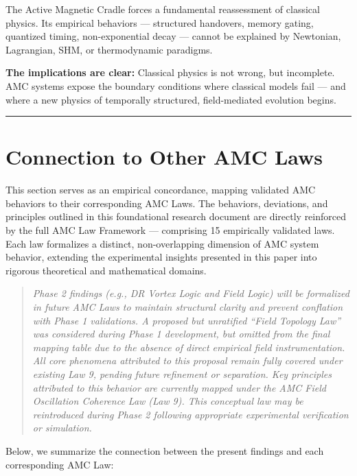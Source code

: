 \documentclass[10pt,aps,pre,onecolumn,superscriptaddress,notitlepage]{revtex4-2}
\begin{document}
The Active Magnetic Cradle forces a fundamental reassessment of classical physics. Its empirical behaviors — structured handovers, memory gating, quantized timing, non-exponential decay — cannot be explained by Newtonian, Lagrangian, SHM, or thermodynamic paradigms. 

\textbf{The implications are clear:}
Classical physics is not wrong, but incomplete. AMC systems expose the boundary conditions where classical models fail — and where a new physics of temporally structured, field-mediated evolution begins. 
\vspace{1em}
\hrule
\vspace{1em}


\section{Connection to Other AMC Laws}
\label{sec:ConnectiontoAMCLaws}
This section serves as an empirical concordance, mapping validated AMC behaviors to their corresponding AMC Laws. The behaviors, deviations, and principles outlined in this foundational research document are directly reinforced by the full AMC Law Framework — comprising 15 empirically validated laws. Each law formalizes a distinct, non-overlapping dimension of AMC system behavior, extending the experimental insights presented in this paper into rigorous theoretical and mathematical domains.

\begin{quote}
\textit{Phase 2 findings (e.g., DR Vortex Logic and Field Logic) will be formalized in future AMC Laws to maintain structural clarity and prevent conflation with Phase 1 validations. A proposed but unratified ``Field Topology Law'' was considered during Phase 1 development, but omitted from the final mapping table due to the absence of direct empirical field instrumentation. All core phenomena attributed to this proposal remain fully covered under existing Law 9, pending future refinement or separation. Key principles attributed to this behavior are currently mapped under the AMC Field Oscillation Coherence Law (Law 9). This conceptual law may be reintroduced during Phase 2 following appropriate experimental verification or simulation.}
\end{quote}

Below, we summarize the connection between the present findings and each corresponding AMC Law:
\end{document}
